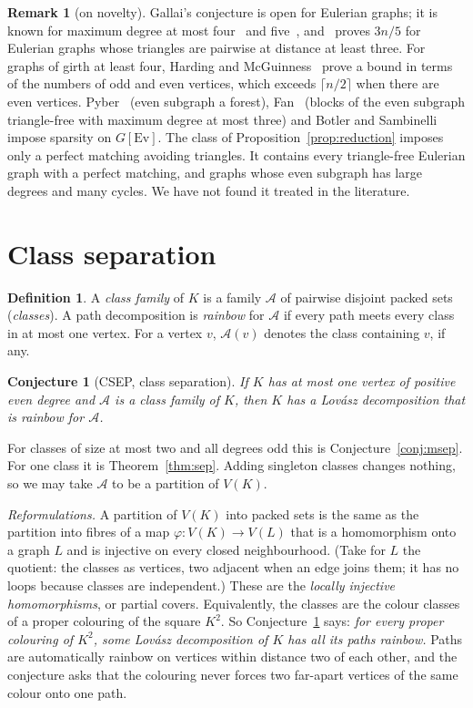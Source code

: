 \documentclass[11pt]{amsart}
\newtheorem{conjecture}[theorem]{Conjecture}
\theoremstyle{definition}
\newtheorem{definition}[theorem]{Definition}
\newtheorem{remark}[theorem]{Remark}
\newcommand{\Ev}{\mathrm{Ev}}
\newcommand{\cA}{\mathcal A}
\begin{document}
\begin{remark}[on novelty]\label{rem:novelty}
Gallai's conjecture is open for Eulerian graphs; it is known for maximum degree at most four~\cite{FK}
and five~\cite{BP19}, and~\cite{CW25} proves $3n/5$ for Eulerian graphs whose triangles are pairwise at
distance at least three. For graphs of girth at least four, Harding and McGuinness~\cite{HM14} prove a
bound in terms of the numbers of odd and even vertices, which exceeds $\lceil n/2\rceil$ when there are
even vertices. Pyber~\cite{Pyb96} (even subgraph a forest), Fan~\cite{Fan05} (blocks of the
even subgraph triangle-free with maximum degree at most three) and Botler and Sambinelli~\cite{BS21}
impose sparsity on $G[\Ev]$. The class of Proposition~\ref{prop:reduction} imposes only a perfect
matching avoiding triangles. It contains every triangle-free Eulerian graph with a perfect matching, and
graphs whose even subgraph has large degrees and many cycles. We have not found it treated in the
literature.
\end{remark}

\section{Class separation}\label{sec:classes}

\begin{definition}\label{def:classes}
A \emph{class family} of $K$ is a family $\cA$ of pairwise disjoint packed sets (\emph{classes}). A path
decomposition is \emph{rainbow} for $\cA$ if every path meets every class in at most one vertex. For a
vertex $v$, $\cA(v)$ denotes the class containing $v$, if any.
\end{definition}

\begin{conjecture}[CSEP, class separation]\label{conj:csep}
If $K$ has at most one vertex of positive even degree and $\cA$ is a class family of $K$, then $K$ has
a Lov\'asz decomposition that is rainbow for $\cA$.
\end{conjecture}

For classes of size at most two and all degrees odd this is Conjecture~\ref{conj:msep}. For one class it is
Theorem~\ref{thm:sep}. Adding singleton classes changes nothing, so we may take $\cA$ to be a partition of
$V(K)$.

\emph{Reformulations.} A partition of $V(K)$ into packed sets is the same as the partition into fibres of
a map $\varphi:V(K)\to V(L)$ that is a homomorphism onto a graph $L$ and is injective on every closed
neighbourhood. (Take for $L$ the quotient: the classes as vertices, two adjacent when an edge joins
them; it has no loops because classes are independent.) These are the \emph{locally injective homomorphisms}, or partial covers.
Equivalently, the classes are the colour classes of a proper colouring of the square $K^2$. So
Conjecture~\ref{conj:csep} says: \emph{for every proper colouring of $K^2$, some Lov\'asz decomposition
of $K$ has all its paths rainbow.} Paths are automatically rainbow on vertices within distance two of each
other, and the conjecture asks that the colouring never forces two far-apart vertices of the same colour
onto one path.
\end{document}
